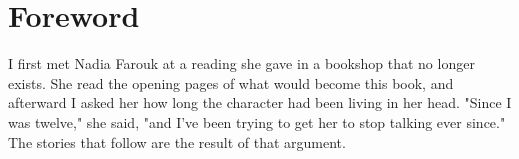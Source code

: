 \chapter{Foreword}

I first met Nadia Farouk at a reading she gave in a bookshop that no
longer exists. She read the opening pages of what would become this
book, and afterward I asked her how long the character had been living
in her head. "Since I was twelve," she said, "and I've been trying to
get her to stop talking ever since." The stories that follow are the
result of that argument.
